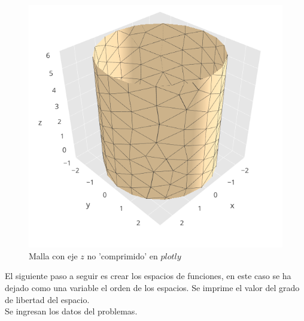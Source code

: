 \begin{figure}[H]
\centering
\includegraphics[scale=0.8]{Imagenes/graficas/Situacion 1/Malla/malla 2.png} 
\caption{Malla con eje $z$ no 'comprimido' en $plotly$}
\end{figure}
El siguiente paso a seguir es crear los espacios de funciones, en este caso se ha dejado como una variable el orden de los espacios. Se imprime el valor del grado de libertad del espacio. \\
Se ingresan los datos del problemas.
